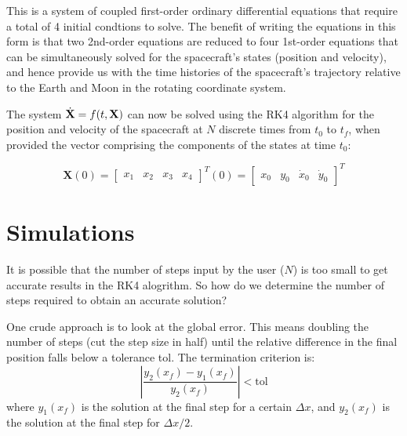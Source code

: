 \documentclass{article}
\begin{document}
\vspace{\baselineskip}

This is a system of coupled first-order ordinary differential equations that require a total of 4 initial condtions to solve. The benefit of writing the equations in this form is that \color{magenta} two 2nd-order equations are reduced to four 1st-order equations \color{white} that can be simultaneously solved for the spacecraft's states (position and velocity), and hence provide us with the time histories of the spacecraft's trajectory relative to the Earth and Moon in the rotating coordinate system.

\vspace{\baselineskip}

The system $\dot{\bf{X}} = f(t,\bf{X})$ can now be solved using the RK4 algorithm for the position and velocity of the spacecraft at $N$ discrete times from $t_0$ to $t_f$, when provided the vector comprising the components of the states at time $t_0$:

\begin{equation*}
    \textbf{X}(0) =
    \begin{bmatrix}
        x_1 & x_2 & x_3 & x_4
    \end{bmatrix}^T(0)
    =
    \begin{bmatrix}
        x_0 & y_0 & \dot{x}_0 & \dot{y}_0
    \end{bmatrix}^T
\end{equation*}

\pagebreak


\section{Simulations}
It is possible that the number of steps input by the user ($N$) is too small to get accurate results in the RK4 alogrithm. So how do we determine the number of steps required to obtain an accurate solution?

\vspace{\baselineskip}

One crude approach is to look at the global error. This means doubling the number of steps (cut the step size in half) until the relative difference in the final position falls below a tolerance tol. The termination criterion is:
\begin{equation*}
    \left|\frac{y_2(x_f) - y_1(x_f)}{y_2(x_f)}\right| < \textrm{tol}
\end{equation*}
where $y_1(x_f)$ is the solution at the final step for a certain $\Delta x$, and $y_2(x_f)$ is the solution at the final step for $\Delta x/2$.
\end{document}
